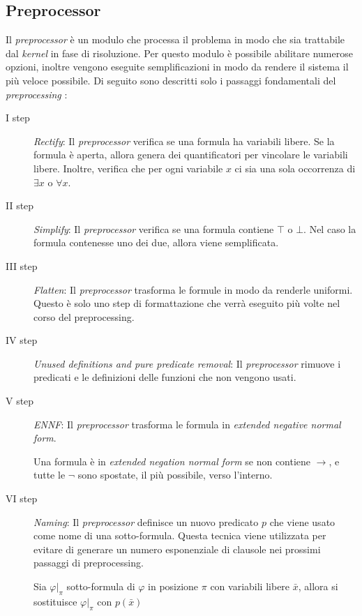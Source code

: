 \subsection{Preprocessor}\label{sec-prepro}
Il \emph{\emph{preprocessor}} è un modulo che processa il problema in modo che sia trattabile dal \emph{kernel} in fase di risoluzione.
Per questo modulo è possibile abilitare numerose opzioni, inoltre vengono eseguite semplificazioni in modo da rendere il sistema il 
più veloce possibile. Di seguito sono descritti solo i passaggi fondamentali del \emph{preprocessing} \cite{reger2016new}: 
\begin{description}
    \item[I step] \emph{Rectify}: Il \emph{preprocessor} verifica se una formula ha variabili libere. Se la formula è aperta, 
    allora genera dei quantificatori per vincolare le variabili libere. Inoltre, verifica che per ogni variabile $x$ ci sia una sola occorrenza di $\exists x$ o $\forall x$. 
    \item[II step] \emph{Simplify}: Il \emph{preprocessor} verifica se una formula contiene $\top$ o $\bot$. Nel caso la formula contenesse uno dei due, allora
    viene semplificata.
    \item[III step] \emph{Flatten}: Il \emph{preprocessor} trasforma le formule in modo da renderle uniformi. Questo è solo uno step di formattazione che verrà eseguito più volte nel corso del preprocessing.
    \item[IV step] \emph{Unused definitions and pure predicate removal}: Il \emph{preprocessor} rimuove i predicati e le definizioni delle funzioni che non vengono usati.
    \item[V step] \emph{ENNF}: Il \emph{preprocessor} trasforma le formula in \emph{extended negative normal form}.
    \begin{definition}
        Una formula è in \emph{extended negation normal form} se non contiene $\rightarrow$, e tutte le $\neg$ sono spostate, il più possibile, verso l'interno.  
    \end{definition}
    \item[VI step] \emph{Naming}: Il \emph{preprocessor} definisce un nuovo predicato $p$ che viene usato come nome di una sotto-formula. 
    Questa tecnica viene utilizzata per evitare di generare un numero esponenziale di clausole nei prossimi passaggi di preprocessing.
    \begin{definition}
        Sia $\varphi|_\pi$ sotto-formula di $\varphi$ in posizione $\pi$ con variabili libere $\bar{x}$, allora si sostituisce $\varphi|_\pi$ con $p(\bar{x})$

\end{definition}
\end{description}
